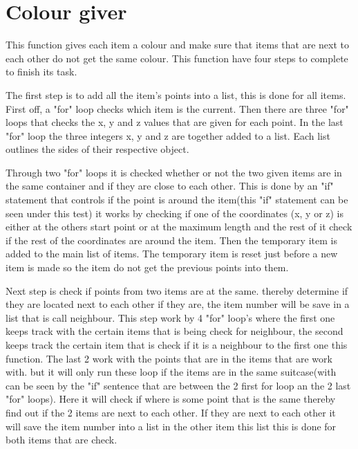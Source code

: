 \section{Colour giver}
This function gives each item a colour and make sure that items that are next to each other do not get the same colour. This function have four steps to complete to finish its task.

The first step is to add all the item's points into a list, this is done for all items. First off, a "for" loop checks which item is the current. Then there are three "for" loops that checks the x, y and z values that are given for each point. In the last "for" loop the three integers x, y and z are together added to a list. Each list outlines the sides of their respective object. 

Through two "for" loops it is checked whether or not the two given items are in the same container and if they are close to each other. This is done by an "if" statement that controls if the point is around the item(this "if" statement can be seen under this test) it works by checking if one of the coordinates (x, y or z) is either at the others start point or at the maximum length and the rest of it check if the rest of the coordinates are around the item. Then the temporary item is added to the main list of items.  The temporary item is reset just before a new item is made so the item do not get the previous points into them.

Next step is check if points from two items are at the same. thereby determine if they are located next to each other if they are, the item number will be save in a list that is call neighbour. This step work by 4 "for" loop's where the first one keeps track with the certain items that is being check for neighbour, the second keeps track  the certain item that is check if it is a neighbour to the first one this function. The last 2 work with the points that are in the items that are work with. but it will only run these loop if the items are in the same suitcase(with can be seen by the "if" sentence that are between the 2 first for loop an the 2 last "for" loops). Here it will check if where is some point that is the same thereby find out if the 2 items are next to each other. If they are next to each other it will save the item number into a list in the other item this list this is done for both items that are check.


